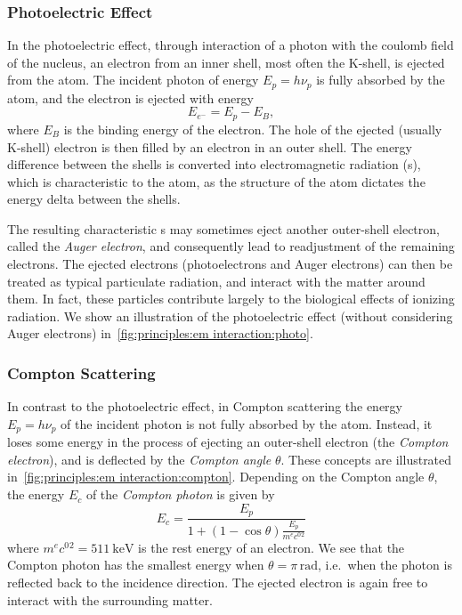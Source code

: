 \documentclass[../ml-tct.tex]{subfiles}
\begin{document}
\subsubsection{Photoelectric Effect}
In the photoelectric effect, through interaction of a photon with the coulomb field of the nucleus, an electron from an inner shell, most often the K-shell, is ejected from the atom.
The incident photon of energy \( E_p = h\nu_p \) is fully absorbed by the atom, and the electron is ejected with energy
\begin{equation}
	E_{e^-} = E_p - E_B,
\end{equation}
where \( E_B \) is the binding energy of the electron.
The hole of the ejected (usually K-shell) electron is then filled by an electron in an outer shell.
The energy difference between the shells is converted into electromagnetic radiation (\xray{}s), which is characteristic to the atom, as the structure of the atom dictates the energy delta between the shells.

The resulting characteristic \xray{}s may sometimes eject another outer-shell electron, called the \emph{Auger electron}, and consequently lead to readjustment of the remaining electrons.
The ejected electrons (photoelectrons and Auger electrons) can then be treated as typical particulate radiation, and interact with the matter around them.
In fact, these particles contribute largely to the biological effects of ionizing radiation.
We show an illustration of the photoelectric effect (without considering Auger electrons) in~\cref{fig:principles:em interaction:photo}.
\subsubsection{Compton Scattering}
In contrast to the photoelectric effect, in Compton scattering the energy \( E_p = h\nu_p \) of the incident photon is not fully absorbed by the atom.
Instead, it loses some energy in the process of ejecting an outer-shell electron (the \emph{Compton electron}), and is deflected by the \emph{Compton angle} \( \theta \).
These concepts are illustrated in~\cref{fig:principles:em interaction:compton}.
Depending on the Compton angle \( \theta \), the energy \( E_c \) of the \emph{Compton photon} is given by
\begin{equation}
	E_c = \frac{E_p}{1 + (1 - \cos \theta)\frac{ E_p}{\si{\electronmass\clight^2}}}
\end{equation}
where \( \si{\electronmass\clight^2} = \SI{511}{\kilo\electronvolt} \) is the rest energy of an electron.
We see that the Compton photon has the smallest energy when \( \theta = \pi\,\mathrm{rad} \), i.e.\ when the photon is reflected back to the incidence direction.
The ejected electron is again free to interact with the surrounding matter.
\end{document}
